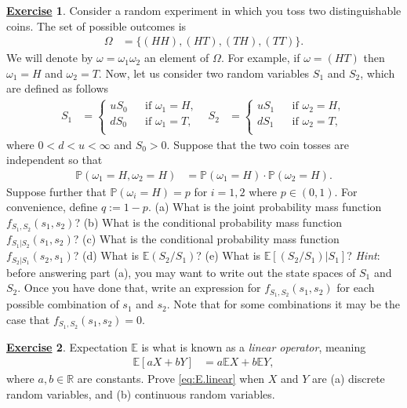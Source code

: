 \documentclass[12pt]{book}
\numberwithin{equation}{chapter}
\theoremstyle{plain}
\numberwithin{theorem}{section}
\theoremstyle{definition}
\newtheorem{exercise}{\underline{Exercise}}
\numberwithin{exercise}{chapter}
\newcommand{\<}{\langle}
\renewcommand{\>}{\rangle}
\renewcommand{\(}{\left(}
\renewcommand{\)}{\right)}
\renewcommand{\[}{\left[}
\renewcommand{\]}{\right]}
\newcommand\Eb{\mathds{E}}
\newcommand\Pb{\mathds{P}}
\newcommand\Rb{\mathds{R}}
\newcommand\om{\omega}
\newcommand\Om{\Omega}
\theoremstyle{definition}
\numberwithin{question}{section}
\begin{document}
\begin{exercise}
\label{exer:A-2}
Consider a random experiment in which you toss two distinguishable coins.  The set of possible outcomes is
\begin{align}
\Om
	&=	\{ (HH), (HT), (TH), (TT) \} .
\end{align}
We will denote by $\om = \om_1 \om_2$ an element of $\Om$.  For example, if $\om = (HT)$ then $\om_1 = H$ and $\om_2 = T$.  Now, let us consider two random variables $S_1$ and $S_2$, which are defined as follows
\begin{align}
S_1
	&=	\left\{ \begin{aligned}
			u S_0 &&\text{if $\om_1 = H$} , \\
			d S_0 &&\text{if $\om_1 = T$} , \\
			\end{aligned} \right.  &
S_2
	&=	\left\{ \begin{aligned}
			u S_1 &&\text{if $\om_2 = H$} , \\
			d S_1 &&\text{if $\om_2 = T$}  , \\
			\end{aligned} \right. 
\end{align}
where $0 < d < u < \infty$ and $S_0 > 0$.  Suppose that the two coin tosses are independent so that
\begin{align}
\Pb( \om_1 = H , \om_2 = H )
	&=	\Pb( \om_1 = H ) \cdot \Pb( \om_2 = H ) .
\end{align}
Suppose further that $\Pb(\om_i = H) = p$ for $i = 1,2$ where $p \in (0,1)$.  For convenience, define $q := 1-p$.
(a) What is the joint probability mass function $f_{S_1,S_2}(s_1,s_2)$?
(b) What is the conditional probability mass function $f_{S_1|S_2}(s_1,s_2)$?
(c) What is the conditional probability mass function $f_{S_2|S_1}(s_2,s_1)$?
(d) What is $\Eb (S_2 / S_1)$?
(e) What is $\Eb [ (S_2 / S_1) | S_1 ]$?
\textit{Hint}: before answering part (a), you may want to write out the state spaces of $S_1$ and $S_2$.  Once you have done that, write an expression for $f_{S_1,S_2}(s_1,s_2)$ for each possible combination of $s_1$ and $s_2$.  Note that for some combinations it may be the case that $f_{S_1,S_2}(s_1,s_2) = 0$.
\end{exercise}

\begin{exercise}
\label{exer:A-3}
Expectation $\Eb$ is what is known as a \textit{linear operator}, meaning
\begin{align}
\Eb[ a X + b Y ]
	&=	a \Eb X + b \Eb Y , \label{eq:E.linear}
\end{align}
where $a,b \in \Rb$ are constants.  Prove \eqref{eq:E.linear} when $X$ and $Y$ are (a) discrete random variables, and (b) continuous random variables.
\end{exercise}
\end{document}
